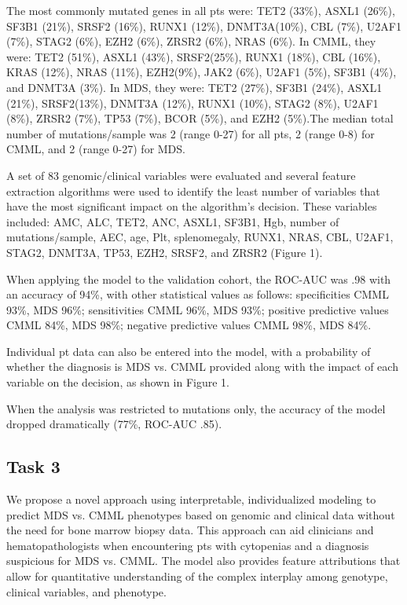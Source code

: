 The most commonly mutated genes in all pts were: TET2 (33\%), ASXL1 (26\%), SF3B1 (21\%), SRSF2 (16\%), RUNX1 (12\%), DNMT3A(10\%), CBL (7\%), U2AF1 (7\%), STAG2 (6\%), EZH2 (6\%), ZRSR2 (6\%), NRAS (6\%). In CMML, they were: TET2 (51\%), ASXL1 (43\%), SRSF2(25\%), RUNX1 (18\%), CBL (16\%), KRAS (12\%), NRAS (11\%), EZH2(9\%), JAK2 (6\%), U2AF1 (5\%), SF3B1 (4\%), and DNMT3A (3\%). In MDS, they were: TET2 (27\%), SF3B1 (24\%), ASXL1 (21\%), SRSF2(13\%), DNMT3A (12\%), RUNX1 (10\%), STAG2 (8\%), U2AF1 (8\%), ZRSR2 (7\%), TP53 (7\%), BCOR (5\%), and EZH2 (5\%).The median total number of mutations/sample was 2 (range 0-27) for all pts, 2 (range 0-8) for CMML, and 2 (range 0-27) for MDS.

A set of 83 genomic/clinical variables were evaluated and several feature extraction algorithms were used to identify the least number of variables that have the most significant impact on the algorithm's decision. These variables included: AMC, ALC, TET2, ANC, ASXL1, SF3B1, Hgb, number of mutations/sample, AEC, age, Plt, splenomegaly, RUNX1, NRAS, CBL, U2AF1, STAG2, DNMT3A, TP53, EZH2, SRSF2, and ZRSR2 (Figure 1).

When applying the model to the validation cohort, the ROC-AUC was .98 with an accuracy of 94\%, with other statistical values as follows: specificities CMML 93\%, MDS 96\%; sensitivities CMML 96\%, MDS 93\%; positive predictive values CMML 84\%, MDS 98\%; negative predictive values CMML 98\%, MDS 84\%.

Individual pt data can also be entered into the model, with a probability of whether the diagnosis is MDS vs. CMML provided along with the impact of each variable on the decision, as shown in Figure 1.

When the analysis was restricted to mutations only, the accuracy of the model dropped dramatically (77\%, ROC-AUC .85).


\subsection{Task 3}%

We propose a novel approach using interpretable, individualized modeling to predict MDS vs. CMML phenotypes based on genomic and clinical data without the need for bone marrow biopsy data. This approach can aid clinicians and hematopathologists when encountering pts with cytopenias and a diagnosis suspicious for MDS vs. CMML. The model also provides feature attributions that allow for quantitative understanding of the complex interplay among genotype, clinical variables, and phenotype.


